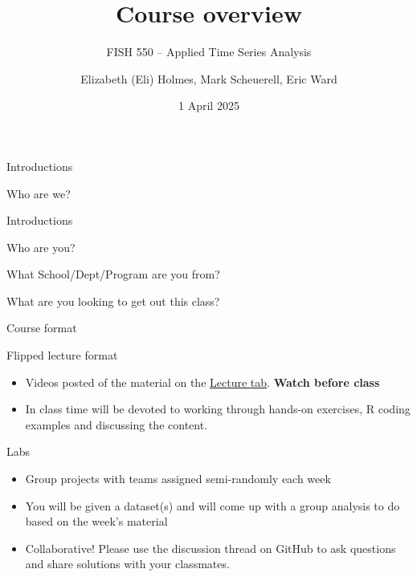 \documentclass[
  ignorenonframetext,
]{beamer}
\title{Course overview}
\subtitle{FISH 550 -- Applied Time Series Analysis}
\author{Elizabeth (Eli) Holmes, Mark Scheuerell, Eric Ward}
\date{1 April 2025}
\providecommand{\tightlist}{%
  \setlength{\itemsep}{0pt}\setlength{\parskip}{0pt}}
\begin{document}
\frame{\titlepage}

\begin{frame}{Introductions}
\label{introductions}
\begin{block}{Who are we?}
\label{who-are-we}
\end{block}
\end{frame}

\begin{frame}{Introductions}
\label{introductions-1}
\begin{block}{Who are you?}
\label{who-are-you}
\end{block}

\begin{block}{What School/Dept/Program are you from?}
\label{what-schooldeptprogram-are-you-from}
\end{block}

\begin{block}{What are you looking to get out this class?}
\label{what-are-you-looking-to-get-out-this-class}
\end{block}
\end{frame}

\begin{frame}{Course format}
\label{course-format}
\begin{block}{Flipped lecture format}
\label{flipped-lecture-format}
\begin{itemize}
\tightlist
\item
  Videos posted of the material on the
  \href{https://atsa-es.github.io/atsa/lectures.html}{Lecture tab}.
  \textbf{Watch before class}
\item
  In class time will be devoted to working through hands-on exercises, R
  coding examples and discussing the content.
\end{itemize}
\end{block}

\begin{block}{Labs}
\label{labs}
\begin{itemize}
\tightlist
\item
  Group projects with teams assigned semi-randomly each week
\item
  You will be given a dataset(s) and will come up with a group analysis
  to do based on the week's material
\item
  Collaborative! Please use the discussion thread on GitHub to ask
  questions and share solutions with your classmates.
\end{itemize}
\end{block}
\end{frame}
\end{document}
